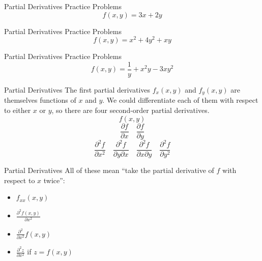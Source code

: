 \documentclass[aspectratio=169]{beamer}
\begin{document}
\begin{frame}{Partial Derivatives Practice Problems}
    \vspace{-4cm}
    \[
    f(x, y) = 3x + 2y
    \]
\end{frame}

\begin{frame}{Partial Derivatives Practice Problems}
    \vspace{-4cm}
    \[
    f(x, y) = x^2 + 4y^2 + xy
    \]
\end{frame}

\begin{frame}{Partial Derivatives Practice Problems}
    \vspace{-4cm}
    \[
    f(x, y) = \frac{1}{y} + x^2y - 3xy^2
    \]
\end{frame}

\begin{frame}{Partial Derivatives}\label{main1}
    The first partial derivatives $f_x(x, y)$ and $f_y(x, y)$ are themselves functions of $x$ and $y$. We could differentiate each of them with respect to either $x$ or $y$, so there are four second-order partial derivatives.
    \[
    f(x, y)
    \]
    \[
    \frac{\partial f}{\partial x} \quad \frac{\partial f}{\partial y}
    \]
    \[
    \frac{\partial^2 f}{\partial x^2} \quad \frac{\partial^2 f}{\partial y \partial x} \quad \frac{\partial^2 f}{\partial x \partial y} \quad \frac{\partial^2 f}{\partial y^2}
    \]

\end{frame}

\begin{frame}{Partial Derivatives}\label{main1}
    All of these mean “take the partial derivative of $f$ with respect to $x$ twice”:
    \begin{itemize}
        \item $f_{xx}(x, y)$
        \item $\frac{\partial^2 f(x, y)}{\partial x^2}$
        \item $\frac{\partial^2}{\partial x^2} f(x, y)$
        \item $\frac{\partial^2 z}{\partial x^2}$ if $z = f(x, y)$
    \end{itemize}
\end{frame}
\end{document}

